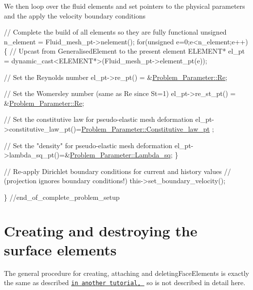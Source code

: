 We then loop over the fluid elements and set pointers to the physical parameters and the apply the velocity boundary conditions


\begin{DoxyCodeInclude}
 
 \textcolor{comment}{// Complete the build of all elements so they are fully functional}
 \textcolor{keywordtype}{unsigned} n\_element = Fluid\_mesh\_pt->nelement();
 \textcolor{keywordflow}{for}(\textcolor{keywordtype}{unsigned} e=0;e<n\_element;e++)
  \{
   \textcolor{comment}{// Upcast from GeneralisedElement to the present element}
   ELEMENT* el\_pt = \textcolor{keyword}{dynamic\_cast<}ELEMENT*\textcolor{keyword}{>}(Fluid\_mesh\_pt->element\_pt(e));
   
   \textcolor{comment}{// Set the Reynolds number}
   el\_pt->re\_pt() = &\hyperlink{namespaceProblem__Parameter_acc656299287d4d9a8374c2c501750b4f}{Problem\_Parameter::Re};
   
   \textcolor{comment}{// Set the Womersley number (same as Re since St=1)}
   el\_pt->re\_st\_pt() = &\hyperlink{namespaceProblem__Parameter_acc656299287d4d9a8374c2c501750b4f}{Problem\_Parameter::Re};
   
   \textcolor{comment}{// Set the constitutive law for pseudo-elastic mesh deformation}
   el\_pt->constitutive\_law\_pt()=\hyperlink{namespaceProblem__Parameter_a9852a6077458693983628319d429f11f}{Problem\_Parameter::Constitutive\_law\_pt}
      ;
   
   \textcolor{comment}{// Set the "density" for pseudo-elastic mesh deformation}
   el\_pt->lambda\_sq\_pt()=&\hyperlink{namespaceProblem__Parameter_a20ea33c391abd96d43f79913377c1e12}{Problem\_Parameter::Lambda\_sq};
  \}
 
 \textcolor{comment}{// Re-apply Dirichlet boundary conditions for current and history values}
 \textcolor{comment}{// (projection ignores boundary conditions!)}
 this->set\_boundary\_velocity();

\} \textcolor{comment}{//end\_of\_complete\_problem\_setup}

\end{DoxyCodeInclude}




 

\hypertarget{index_surface}{}\section{Creating and destroying the surface elements}\label{index_surface}
The general procedure for creating, attaching and deleting{\ttfamily Face\+Elements} is exactly the same as described \href{../../../../doc/poisson/two_d_poisson_flux_bc/html/index.html}{\tt in another tutorial, } so is not described in detail here.

